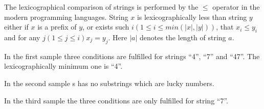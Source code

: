 The lexicographical comparison of strings is performed by the $\leq$ operator in
the modern programming languages. String $x$ is lexicographically less than
string $y$ either if $x$ is a prefix of $y$, or exists such $i (1 \leq i \leq
        min(|x|, |y|))$, that $x_i \leq y_i$ and for any $j (1 \leq  j \leq i)
x_j = y_j$.  Here $|a|$ denotes the length of string $a$.

In the first sample three conditions are fulfilled for strings ``4'', ``7'' and
``47''. The lexicographically minimum one is ``4''.

In the second sample s has no substrings which are lucky numbers.

In the third sample the three conditions are only fulfilled for string ``7''.

\newpage
